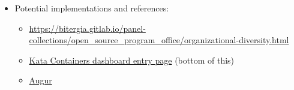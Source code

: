 \begin{itemize}
\tightlist
\item
  Potential implementations and references:

  \begin{itemize}
  \tightlist
  \item
    \href{https://bitergia.gitlab.io/panel-collections/open_source_program_office/organizational-diversity.html}{https://bitergia.gitlab.io/panel-collections/open\_source\_program\_office/organizational-diversity.html}
  \item
    \href{https://katacontainers.biterg.io}{Kata Containers dashboard
    entry page} (bottom of this)
  \item
    \href{https://github.com/chaoss/augur}{Augur}
  \end{itemize}
\end{itemize}
